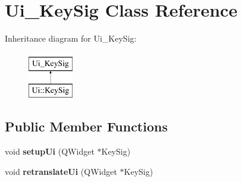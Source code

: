 \hypertarget{class_ui___key_sig}{}\section{Ui\+\_\+\+Key\+Sig Class Reference}
\label{class_ui___key_sig}
Inheritance diagram for Ui\+\_\+\+Key\+Sig\+:\begin{figure}[H]
\begin{center}
\leavevmode
\includegraphics[height=2.000000cm]{class_ui___key_sig}
\end{center}
\end{figure}
\subsection*{Public Member Functions}
\begin{DoxyCompactItemize}
\item 
\mbox{\label{class_ui___key_sig_a95769fc39fc96837250f3a0efae6d630}} 
void {\bfseries setup\+Ui} (Q\+Widget $\ast$Key\+Sig)
\item 
\mbox{\label{class_ui___key_sig_a507fb48254c2c1be9b88087c15d8b11d}} 
void {\bfseries retranslate\+Ui} (Q\+Widget $\ast$Key\+Sig)
\end{DoxyCompactItemize}
